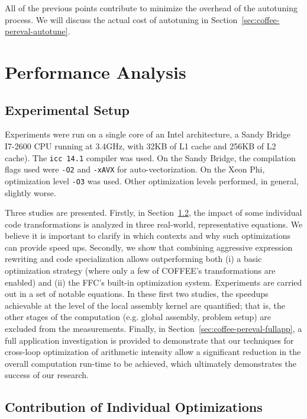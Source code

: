 All of the previous points contribute to minimize the overhead of the autotuning process. We will discuss the actual cost of autotuning in Section~\ref{sec:coffee-pereval-autotune}.

\section{Performance Analysis}
\label{sec:coffee-perfeval}

\subsection{Experimental Setup}
\label{sec:coffee-perfeval-setup}
Experiments were run on a single core of an Intel architecture, a Sandy Bridge I7-2600 CPU running at 3.4GHz, with 32KB of L1 cache and 256KB of L2 cache). The \texttt{icc 14.1}  compiler was used. On the Sandy Bridge, the compilation flags used were \texttt{-O2} and \texttt{-xAVX} for auto-vectorization. On the Xeon Phi, optimization level \texttt{-O3} was used. Other optimization levels performed, in general, slightly worse.

Three studies are presented. Firstly, in Section~\ref{sec:coffee-perfeval-single}, the impact of some individual code transformations is analyzed in three real-world,
representative equations. We believe it is important to clarify in which contexts and why such optimizations can provide speed ups. Secondly, we show that combining aggressive expression rewriting and code specialization allows outperforming both (i) a basic optimization strategy (where only a few of COFFEE's transformations are enabled) and (ii) the FFC's built-in optimization system. Experiments are carried out in a set of notable equations. In these first two studies, the speedups achievable at the level of the local assembly kernel are quantified; that is, the other stages of the computation (e.g. global assembly, problem setup) are excluded from the measurements. Finally, in Section~\ref{sec:coffee-pereval-fullapp}, a full application investigation is provided to demonstrate that our techniques for cross-loop optimization of arithmetic intensity allow a significant reduction in the overall computation run-time to be achieved, which ultimately demonstrates the success of our research.

\subsection{Contribution of Individual Optimizations}
\label{sec:coffee-perfeval-single}


